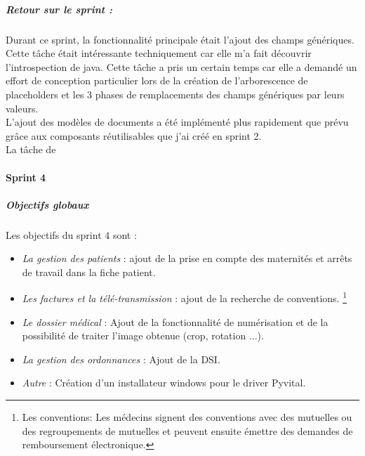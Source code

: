\subparagraph{Retour sur le sprint :}
Durant ce sprint, la fonctionnalité principale était l'ajout des champs génériques. Cette tâche était intéressante techniquement car elle m'a fait découvrir l'introspection de java. Cette tâche a pris un certain temps car elle a demandé un effort de conception particulier lors de la création de l'arborescence de placeholders et les 3 phases de remplacements des champs génériques par leurs valeurs.  \\
L'ajout des modèles de documents a été implémenté plus rapidement que prévu grâce aux composants réutilisables que j'ai créé en sprint 2.\\
La tâche de 

\newpage
\paragraph*{Sprint 4}
\subparagraph{Objectifs globaux}

Les objectifs du sprint 4 sont : 
\begin{itemize}
\item \textit{La gestion des patients} : ajout  de la prise en compte des maternités et arrêts de travail dans la fiche patient.

\item \textit{Les factures et la télé-transmission} : ajout de la recherche de conventions. \footnote{Les conventions: Les médecins signent des conventions avec des mutuelles ou des regroupements de mutuelles et peuvent ensuite émettre des demandes de remboursement électronique.} 

\item \textit{Le dossier médical} : Ajout de la fonctionnalité de numérisation et de la possibilité de traiter l'image obtenue (crop, rotation ...).

\item \textit{La gestion des ordonnances} : Ajout de la \gls{DSI}.

\item \textit{Autre} : Création d'un installateur windows pour le driver Pyvital. 
\end{itemize} 

